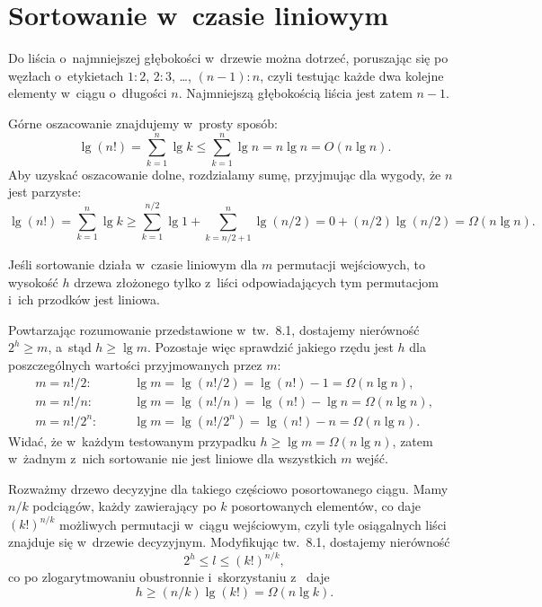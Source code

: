 \chapter{Sortowanie w~czasie liniowym}


\exercise %
Do liścia o~najmniejszej głębokości w~drzewie można dotrzeć, poruszając się po węzłach o~etykietach $1:2$, $2:3$, \dots, $(n-1):n$, czyli testując każde dwa kolejne elementy w~ciągu o~długości $n$. Najmniejszą głębokością liścia jest zatem $n-1$.

\exercise %
Górne oszacowanie znajdujemy w~prosty sposób:
\[
	\lg(n!) = \sum_{k=1}^n\lg k \le \sum_{k=1}^n\lg n = n\lg n = O(n\lg n).
\]
Aby uzyskać oszacowanie dolne, rozdzialamy sumę, przyjmując dla wygody, że $n$ jest parzyste:
\[
	\lg(n!) = \sum_{k=1}^n\lg k \ge \sum_{k=1}^{n/2}\lg 1+\sum_{k=n/2+1}^n\lg(n/2) = 0+(n/2)\lg(n/2) = \Omega(n\lg n).
\]

\exercise %
Jeśli sortowanie działa w~czasie liniowym dla $m$ permutacji wejściowych, to wysokość $h$ drzewa złożonego tylko z~liści odpowiadających tym permutacjom i~ich przodków jest liniowa.

Powtarzając rozumowanie przedstawione w~tw.~8.1, dostajemy nierówność $2^h\ge m$, a~stąd $h\ge\lg m$. Pozostaje więc sprawdzić jakiego rzędu jest $h$ dla poszczególnych wartości przyjmowanych przez $m$:
\begin{align*}
	m = n!/2: &\qquad \lg m = \lg(n!/2) = \lg(n!)-1 = \Omega(n\lg n), \\
	m = n!/n: &\qquad \lg m = \lg(n!/n) = \lg(n!)-\lg n = \Omega(n\lg n), \\
	m = n!/2^n: &\qquad \lg m = \lg(n!/2^n) = \lg(n!)-n = \Omega(n\lg n).
\end{align*}
Widać, że w~każdym testowanym przypadku $h\ge\lg m=\Omega(n\lg n)$, zatem w~żadnym z~nich sortowanie nie jest liniowe dla wszystkich $m$ wejść.

\exercise %
Rozważmy drzewo decyzyjne dla takiego częściowo posortowanego ciągu. Mamy $n/k$ podciągów, każdy zawierający po $k$ posortowanych elementów, co daje $(k!)^{n/k}$ możliwych permutacji w~ciągu wejściowym, czyli tyle osiągalnych liści znajduje się w~drzewie decyzyjnym. Modyfikując tw.~8.1, dostajemy nierówność
\[
	2^h \le l \le (k!)^{n/k},
\]
co po zlogarytmowaniu obustronnie i~skorzystaniu z~ daje
\[
	h \ge (n/k)\lg(k!) = \Omega(n\lg k).
\]


